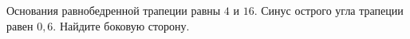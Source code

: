 \begin{ex}
	\begin{condition}
		Основания равнобедренной трапеции равны \( 4 \)  и \( 16 \). Синус острого угла трапеции равен \( 0,6 \). Найдите боковую сторону.
	\end{condition}
\end{ex}